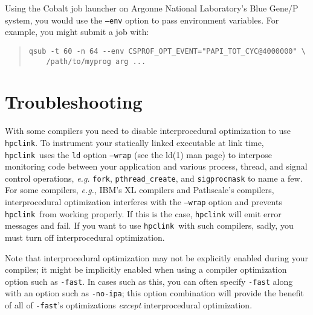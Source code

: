 \documentclass[12pt]{article}
\newcommand{\hpclink}{\texttt{hpclink}}
\begin{document}
Using the Cobalt job launcher on Argonne National Laboratory's Blue Gene/P system, you would use  the {\tt --env} option to pass environment
variables.  For example, you might submit a job with:

\begin{quote}
\begin{verbatim}
qsub -t 60 -n 64 --env CSPROF_OPT_EVENT="PAPI_TOT_CYC@4000000" \
    /path/to/myprog arg ...
\end{verbatim}
\end{quote}

\section{Troubleshooting}

With some compilers you need to disable interprocedural
optimization to use \hpclink.  To instrument your statically linked executable at link time, \hpclink\ uses the
 {\tt ld} option {\tt --wrap} (see the ld(1) man page) to interpose monitoring code between your application and various process, thread, and signal control operations, {\em e.g.}  {\tt fork},  {\tt pthread\_create}, and {\tt sigprocmask} to name a few. For some compilers, {\em e.g.}, IBM's XL compilers and Pathscale's compilers,
interprocedural optimization interferes with the {\tt --wrap} option
and prevents \hpclink\ from working properly. If this is the case, \hpclink{} will emit error messages and fail. If you want to use \hpclink\ with such compilers, sadly, you must turn off interprocedural optimization. 

Note that interprocedural optimization may not be explicitly enabled during your compiles; it might be implicitly enabled when using a compiler optimization option such as {\tt -fast}. In cases such as this, you can often specify {\tt -fast} along with an option such as {\tt -no-ipa}; this option combination will provide the benefit of all of {\tt -fast}'s optimizations {\em except} interprocedural optimization.
\end{document}

